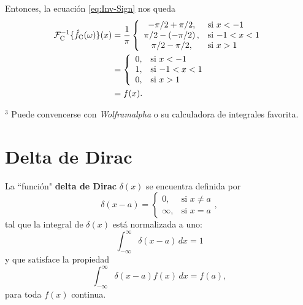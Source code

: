 \begin{ejemplo}
Entonces, la ecuación \eqref{eq:Inv-Sign} nos queda
\begin{align}
    \mathcal{F}^{-1}_{\rm C}\{\hat{f}_{\rm C}(\omega)\}(x) &= \frac{1}{\pi} \left\{ \begin{array}{cl}
        - \pi/2 + \pi/2, & \text{si $x < -1$} \\
        \pi/2 - \left( - \pi/2 \right), & \text{si $-1 < x < 1$} \\
        \pi/2 - \pi/2, & \text{si $x > 1$}
    \end{array}\right. \nonumber \\
    &= \left\{ \begin{array}{cl}
        0, & \text{si $x < -1$} \\
        1, & \text{si $-1 < x < 1$} \\
        0, & \text{si $x > 1$}
    \end{array}\right. \nonumber \\
    &= f(x).
\end{align}

\vfill
    \footnoterule
    
    {\footnotesize
    $^3$ Puede convencerse con \textit{Wolframalpha} o su calculadora de integrales favorita.
    }

\end{ejemplo}

\section{Delta de Dirac}

La ``función" \textbf{delta de Dirac} $\delta(x)$ se encuentra definida por
\begin{equation}
\delta(x-a) = \left\{ \begin{array}{cl}
    0, & \text{si $x \neq a$}  \\
    \infty, & \text{si $x = a$} 
\end{array} \right.,    
\end{equation}
tal que la integral de $\delta(x)$ está normalizada a uno:
\begin{equation}
\int_{-\infty}^{\infty} \delta(x-a) \,dx = 1    
\end{equation}
y que satisface la propiedad
\begin{equation}
  \int_{-\infty}^{\infty} \delta(x-a) f(x) \,dx = f(a),
\end{equation}
para toda $f(x)$ continua.

